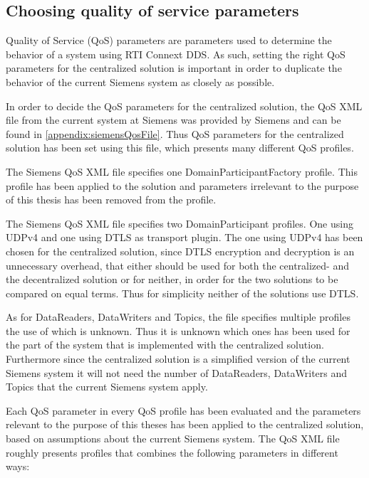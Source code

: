 \subsection{Choosing quality of service parameters}\label{sec:choosingQosParams}

Quality of Service (QoS) parameters are parameters used to determine the behavior of a system using RTI Connext DDS. As such, setting the right QoS parameters for the centralized solution is important in order to duplicate the behavior of the current Siemens system as closely as possible. 

In order to decide the QoS parameters for the centralized solution, the QoS XML file from the current system at Siemens was provided by Siemens and can be found in \cref{appendix:siemensQosFile}. Thus QoS parameters for the centralized solution has been set using this file, which presents many different QoS profiles.

The Siemens QoS XML file specifies one DomainParticipantFactory profile. This profile has been applied to the solution and parameters irrelevant to the purpose of this thesis has been removed from the profile.

The Siemens QoS XML file specifies two DomainParticipant profiles. One using UDPv4 and one using DTLS as transport plugin. The one using UDPv4 has been chosen for the centralized solution, since DTLS encryption and decryption is an unnecessary overhead, that either should be used for both the centralized- and the decentralized solution or for neither, in order for the two solutions to be compared on equal terms. Thus for simplicity neither of the solutions use DTLS.

As for DataReaders, DataWriters and Topics, the file specifies multiple profiles the use of which is unknown. Thus it is unknown which ones has been used for the part of the system that is implemented with the centralized solution. Furthermore since the centralized solution is a simplified version of the current Siemens system it will not need the number of DataReaders, DataWriters and Topics that the current Siemens system apply.

Each QoS parameter in every QoS profile has been evaluated and the parameters relevant to the purpose of this theses has been applied to the centralized solution, based on assumptions about the current Siemens system. The QoS XML file roughly presents profiles that combines the following parameters in different ways:

